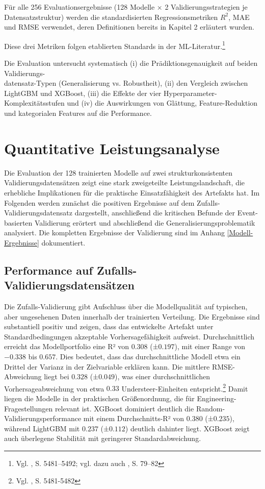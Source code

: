 Für alle 256 Evaluationsergebnisse (128 Modelle × 2 Validierungsstrategien je Datensatzstruktur) werden die standardisierten Regressionsmetriken $R^2$, MAE und RMSE verwendet, deren Definitionen bereits in Kapitel 2 erläutert wurden.

Diese drei Metriken folgen etablierten Standards in der \ac{ML}-Literatur.\footnote{Vgl. \cite{Hodson2022}, S. 5481–5492; vgl. dazu auch \cite{Willmott2005}, S. 79–82}

Die Evaluation untersucht systematisch (i) die Prädiktionsgenauigkeit auf beiden Validierungs-\\datensatz-Typen (Generalisierung vs. Robustheit), (ii) den Vergleich zwischen LightGBM und XGBoost, (iii) die Effekte der vier Hyperparameter-Komplexitätsstufen und (iv) die Auswirkungen von Glättung, Feature-Reduktion und kategorialen Features auf die Performance.


\section{Quantitative Leistungsanalyse}

Die Evaluation der 128 trainierten Modelle auf zwei strukturkonsistenten Validierungsdatensätzen zeigt eine stark zweigeteilte Leistungslandschaft, die erhebliche Implikationen für die praktische Einsatzfähigkeit des Artefakts hat. Im Folgenden werden zunächst die positiven Ergebnisse auf dem Zufalls-Validierungsdatensatz dargestellt, anschließend die kritischen Befunde der Event-basierten Validierung erörtert und abschließend die Generalisierungsproblematik analysiert.
Die kompletten Ergebnisse der Validierung sind im Anhang \ref{Modell-Ergebnisse} dokumentiert.

\subsection{Performance auf Zufalls-Validierungsdatensätzen}

Die Zufalls-Validierung gibt Aufschluss über die Modellqualität auf typischen, aber ungesehenen Daten innerhalb der trainierten Verteilung. Die Ergebnisse sind substantiell positiv und zeigen, dass das entwickelte Artefakt unter Standardbedingungen akzeptable Vorhersagefähigkeit aufweist.
Durchschnittlich erreicht das Modellportfolio eine R² von $0.308$ (±$0.197$), mit einer Range von $-0.338$ bis $0.657$. Dies bedeutet, dass das durchschnittliche Modell etwa ein Drittel der Varianz in der Zielvariable erklären kann. Die mittlere RMSE-Abweichung liegt bei $0.328$ (±$0.049$), was einer durchschnittlichen Vorhersageabweichung von etwa $0.33$ Understeer-Einheiten entspricht.\footnote{Vgl. \cite{Hodson2022}, S. 5481-5482} Damit liegen die Modelle in der praktischen Größenordnung, die für Engineering-Fragestellungen relevant ist. XGBoost dominiert deutlich die Random-Validierungsperformance mit einem Durchschnitts-R² von $0.380$ (±$0.235$), während LightGBM mit $0.237$ (±$0.112$) deutlich dahinter liegt. XGBoost zeigt auch überlegene Stabilität mit geringerer Standardabweichung.

